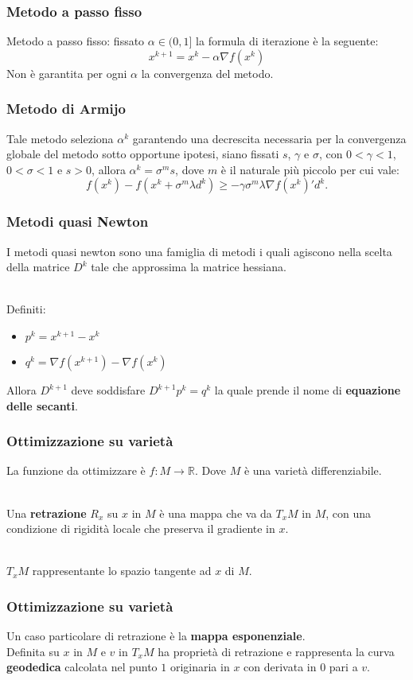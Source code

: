 \documentclass{beamer}
\begin{document}
\begin{frame}
\frametitle{Metodo a passo fisso}
Metodo a passo fisso: fissato $\alpha \in (0, 1]$ la formula di iterazione è la seguente:
\[x^{k+1} = x^k - \alpha \nabla f(x^k)\]
Non è garantita per ogni $\alpha$ la convergenza del metodo.
\end{frame}

\begin{frame}
\frametitle{Metodo di Armijo}
Tale metodo seleziona $\alpha^k$ garantendo una decrescita necessaria per la convergenza globale del metodo sotto opportune ipotesi, siano fissati $s$, $\gamma$ e  $\sigma$,  con $0 < \gamma < 1$, $0 < \sigma < 1$ e $s > 0$, allora $\alpha^k =\sigma^ms$, dove $m$ è il naturale più piccolo per cui vale:
\[f(x^k) - f(x^k + \sigma^m \lambda d^k) \geq -\gamma \sigma^m \lambda \nabla f(x^k)'d^k.\]
\end{frame}

\begin{frame}
\frametitle{Metodi quasi Newton}
I metodi quasi newton sono una famiglia di metodi i quali agiscono nella scelta della matrice $D^k$ tale che approssima la matrice hessiana.\\~\

Definiti:
\begin{itemize}
    \item $p^k = x^{k+1} - x^k$
    \item $q^k = \nabla f(x^{k+1}) - \nabla f(x^k)$
\end{itemize}
Allora $D^{k+1}$  deve soddisfare $D^{k+1}p^k= q^k$ la quale prende il nome di \textbf{equazione delle secanti}.
\end{frame}

\begin{frame}
\frametitle{Ottimizzazione su varietà}
La funzione da ottimizzare è $f : M \to \mathbb{R}$.
Dove $M$ è una varietà differenziabile.\\~\

Una \textbf{retrazione} $R_x$ su $x$ in $M$ è una mappa che va da $T_xM$ in $M$, con una condizione di rigidità locale che preserva il gradiente in $x$.\\~\

$T_xM$ rappresentante lo spazio tangente ad $x$ di $M$.
\end{frame}

\begin{frame}
\frametitle{Ottimizzazione su varietà}
Un caso particolare di retrazione è la \textbf{mappa esponenziale}.\\
Definita su $x$ in $M$ e $v$ in $T_xM$ ha proprietà di retrazione e rappresenta la curva \textbf{geodedica} calcolata nel punto $1$ originaria in $x$ con derivata in $0$ pari a $v$.
\end{frame}
\end{document}
